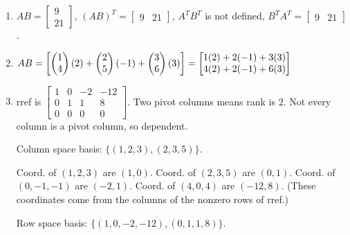 {\begin{multicols}{2}
\begin{enumerate}
\begin{enumerate}
	The general solution is $z(2,-1,1,0)+w(12,-8,0,1)$. Two solutions are $\vec x_1 = (2,-1,1,0)$, $\vec x_2 = (12,-8,0,1)$, sum is $\vec w=(14,-9,1,1)$ and $A\vec w=(0,0,0)$. The sum of any two solutions is again a solution.
	
	\item 
	$AB
	=
	\begin{bmatrix}
 9 \\
 21
	\end{bmatrix}
	$, 
	$(AB)^T	=
	\begin{bmatrix}
 9 & 21
	\end{bmatrix}
  $, 
	$A^TB^T$ is not defined, 
	$B^TA^T	=
	\begin{bmatrix}
 9 & 21
	\end{bmatrix}
  $.	
	
	\item 
	$AB = 
	\begin{bmatrix}
	\begin{pmatrix}\begin{matrix} 1\\4 \end{matrix}\end{pmatrix}(2)
	+\begin{pmatrix}\begin{matrix} 2\\5 \end{matrix}\end{pmatrix}(-1)
	+\begin{pmatrix}\begin{matrix} 3\\6 \end{matrix}\end{pmatrix}(3)	
	\end{bmatrix}
	=
	\begin{bmatrix}
	1(2)+2(-1)+3(3)\\
	4(2)+2(-1)+6(3)
	\end{bmatrix}
	$
	
	
	
	\item rref is $\begin{bmatrix}
 1 & 0 & -2 & -12  \\
 0 & 1 & 1 & 8  \\
 0 & 0 & 0 & 0 
	\end{bmatrix}$. Two pivot columns means rank is 2. Not every column is a pivot column, so dependent. 
	
	Column space basis: $\{(1,2,3),(2,3,5)\}$.
	
	Coord. of $(1,2,3)$ are $(1,0)$.
	Coord. of $(2,3,5)$ are $(0,1)$.
	Coord. of $(0,-1,-1)$ are $(-2,1)$.
	Coord. of $(4,0,4)$ are $(-12,8)$.
	(These coordinates come from the columns of the nonzero rows of rref.)
	
	Row space basis: $\{(1,0,-2,-12), (0,1,1,8)\}$.
	

\end{enumerate}
\end{enumerate}
\end{multicols}}
